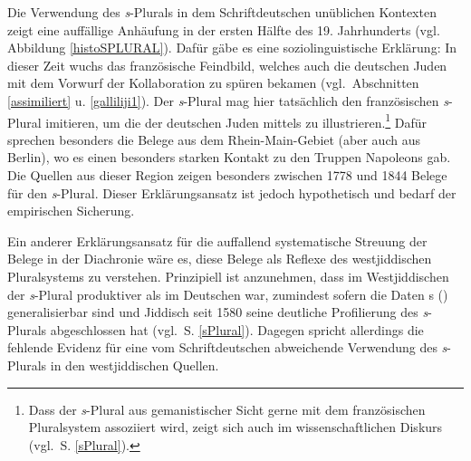 Die Verwendung des \textit{s}-Plurals in dem Schriftdeutschen unüblichen Kontexten zeigt eine auffällige Anhäufung in der ersten Hälfte des 19. Jahrhunderts (vgl.\, Abbildung \ref{histoSPLURAL}). Dafür gäbe es eine soziolinguistische Erklärung: In dieser Zeit wuchs das französische Feindbild, welches auch die deutschen Juden mit dem Vorwurf der Kollaboration zu spüren bekamen (vgl.\, Abschnitten \ref{assimiliert} u. \ref{galliliji1}). Der \textit{s}-Plural mag hier tatsächlich den französischen \textit{s}-Plural imitieren, um die  der deutschen Juden mittels  zu illustrieren.\footnote{Dass der \textit{s}-Plural aus gemanistischer Sicht gerne mit dem französischen Pluralsystem assoziiert wird, zeigt sich auch im wissenschaftlichen Diskurs (vgl.\, S. \ref{sPlural}).} Dafür sprechen besonders die Belege aus dem Rhein-Main-Gebiet (aber auch aus Berlin), wo es einen besonders starken Kontakt zu den Truppen Napoleons gab. Die Quellen aus dieser Region zeigen besonders zwischen 1778 und 1844 Belege für den \textit{s}-Plural. Dieser Erklärungsansatz ist jedoch hypothetisch und bedarf der empirischen Sicherung.
 
Ein anderer Erklärungsansatz für die auffallend systematische Streuung der Belege in der Diachronie wäre es, diese Belege als Reflexe des westjiddischen Pluralsystems zu verstehen. Prinzipiell ist anzunehmen, dass im Westjiddischen der \textit{s}-Plural produktiver als im Deutschen war, zumindest sofern die Daten \citeauthor{Timm2007}s (\citeyear{Timm2007}) generalisierbar sind und Jiddisch seit 1580 seine deutliche Profilierung des \textit{s}-Plurals abgeschlossen hat (vgl.\, S. \ref{sPlural}). Dagegen spricht allerdings die fehlende Evidenz für eine vom Schriftdeutschen abweichende Verwendung des \textit{s}-Plurals in den westjiddischen Quellen.

